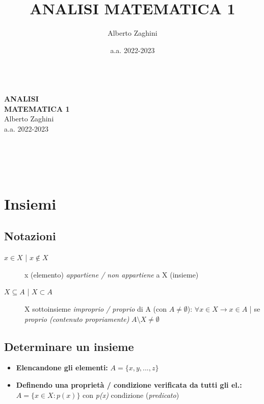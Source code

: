 \documentclass[10pt, oneside]{book}
\title{ANALISI MATEMATICA 1}
\author{Alberto Zaghini}
\date{a.a. 2022-2023}
\theoremstyle{plain}
\begin{document}
\makeatletter
\begin{titlepage}
\vspace{-2.1cm}
\hspace{0cm}
\vfill
\, \\\larger[20]\textsf{\textbf{ANALISI \\MATEMATICA 1}}
\\\smaller[2]Alberto Zaghini
\\a.a. 2022-2023
\\~\\ \larger[20]\,\,
\\~\\ \,\,

\vfill
\hspace{0cm}
\end{titlepage}
\makeatother

\tableofcontents
\newpage

\chapter{Insiemi}

\section{Notazioni}

\begin{description}
\item[\boldmath $x \in X$  | $x \notin X$] x (elemento) \textit{appartiene / non appartiene} a X (insieme)
\item[\boldmath $X \subseteq A$  |  $X \subset A$] X sottoinsieme \textit{improprio / proprio} di A (con $A \neq \emptyset $): $\forall x \in X \rightarrow x \in A$ | se \textit{proprio (contenuto propriamente)} $A \setminus X \neq \emptyset $
\end{description}

\section{Determinare un insieme}
\begin{itemize}[label= $\ast$]
\item \textbf{Elencandone gli elementi:} $A = \{x,y,...,z\}$
\item \textbf{Definendo una proprietà / condizione verificata da tutti gli el.:} \newline $A = \{x \in X : p(x)\}$ con \textit{p(x)} condizione (\textit{predicato})
\end{itemize}
\end{document}
